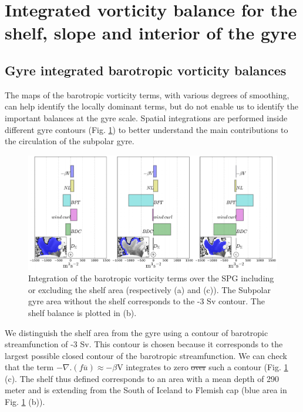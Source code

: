 \documentclass[os, manuscript]{copernicus}
\providecommand{\DIFadd}[1]{{\protect\color{blue}\uwave{#1}}} %
\providecommand{\DIFdel}[1]{{\protect\color{red}\sout{#1}}}                      %
\providecommand{\DIFaddbegin}{} %
\providecommand{\DIFaddend}{} %
\providecommand{\DIFdelbegin}{} %
\providecommand{\DIFdelend}{} %
\begin{document}
\section{Integrated vorticity balance for the shelf, slope and interior of the gyre}
\subsection{Gyre integrated barotropic vorticity balances}

The maps of the barotropic vorticity terms, with various degrees of smoothing, can help identify the locally dominant terms, but do not enable us to identify the important balances at the gyre scale. Spatial integrations are performed inside different gyre contours (Fig. \ref{f09}) to better understand the main contributions to the circulation of the subpolar gyre. 

\begin{figure}[t]
\includegraphics[width=14cm]{../fig_os/f09.pdf}
\caption{Integration of the barotropic vorticity terms over the SPG including or excluding the shelf area (respectively (a) and (c)). The Subpolar gyre area without the shelf corresponds to the -3 Sv contour. The shelf balance is plotted in (b).}
\label{f09}
\end{figure} 

We distinguish the shelf area from the gyre using a contour of barotropic streamfunction of -3 Sv. This contour is chosen because it corresponds to the largest possible closed contour of the barotropic streamfunction. We can check that the term $-\nabla.(f\overline{u}) \approx -\beta$V integrates to zero \DIFdelbegin \DIFdel{over }\DIFdelend \DIFaddbegin \DIFadd{within }\DIFaddend such a contour (Fig. \ref{f09} (c). The shelf thus defined corresponds to an area with a mean depth of 290 meter and is extending from the South of Iceland to Flemish cap (blue area in Fig. \ref{f09} (b)).
\end{document}
